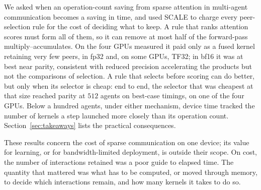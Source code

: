 We asked when an operation-count saving from sparse attention in multi-agent
communication becomes a saving in time, and used SCALE to charge every
peer-selection rule for the cost of deciding what to keep. A rule that ranks
attention scores must form all of them, so it can remove at most half of the
forward-pass multiply--accumulates. On the four GPUs measured it paid only as a
fused kernel retaining very few peers, in fp32 and, on some GPUs, TF32; in bf16 it was at best near
parity, consistent with reduced precision accelerating the products but not
the comparisons of selection. A rule that selects before scoring can do
better, but only when its selector is cheap: end to end, the selector that was
cheapest at that size reached parity at $512$ agents on best-case timings, on one of the four GPUs. Below a hundred
agents, under either mechanism, device time tracked the number of kernels a
step launched more closely than its operation count. Section~\ref{sec:takeaways} lists the practical consequences.

These results concern the cost of sparse communication on one device; its value
for learning, or for bandwidth-limited deployment, is outside their scope. On
cost, the number of interactions retained was a poor guide to elapsed time.
The quantity that mattered was what has to be computed, or moved through
memory, to decide which interactions remain, and how many kernels it takes to
do so.

